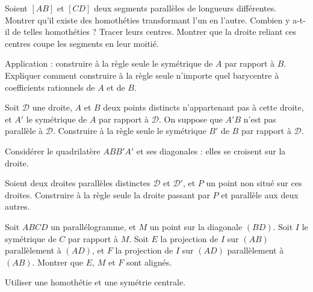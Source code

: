  

\begin{exo}
Soient $[AB]$ et $[CD]$ deux segments parallèles de longueurs différentes. Montrer qu'il existe des homothéties transformant l'un en l'autre. Combien y a-t-il de telles homothéties ? Tracer leurs centres. Montrer que la droite reliant ces centres coupe les segments en leur moitié.

Application : construire à la règle seule le symétrique de $A$ par rapport à $B$. Expliquer comment construire à la règle seule n'importe quel barycentre à coefficients rationnels de $A$ et de $B$.
\end{exo}  



\begin{exo}
Soit $\mathcal D$ une droite, $A$ et $B$ deux points distincts  n'appartenant pas à cette droite, et $A'$ le symétrique de $A$ par rapport à $\mathcal D$. On suppose que $A'B$ n'est pas parallèle à $\mathcal D$. Construire à la règle seule le symétrique $B'$ de $B$ par rapport à $\mathcal D$.

\begin{hint}   
Considérer le quadrilatère $ABB'A'$ et ses diagonales : elles se croisent sur la droite.
\end{hint} 
     
\end{exo}  

\begin{exo}
Soient deux droites parallèles distinctes $\mathcal D$ et $\mathcal D'$, et $P$ un point non situé sur ces droites. Construire à la règle seule la droite passant par $P$ et parallèle aux deux autres.
\end{exo}  


\begin{exo}

Soit $ABCD$ un parallélogramme, et $M$ un point sur la diagonale $(BD)$. Soit $I$ le symétrique de $C$ par rapport à $M$. Soit $E$ la projection de $I$ sur $(AB)$ parallèlement à $(AD)$, et $F$ la projection de $I$ sur $(AD)$ parallèlement à $(AB)$. Montrer que $E$, $M$ et $F$ sont alignés.

\begin{hint}    Utiliser une homothétie et une symétrie centrale.
\end{hint}
      
\end{exo}  








